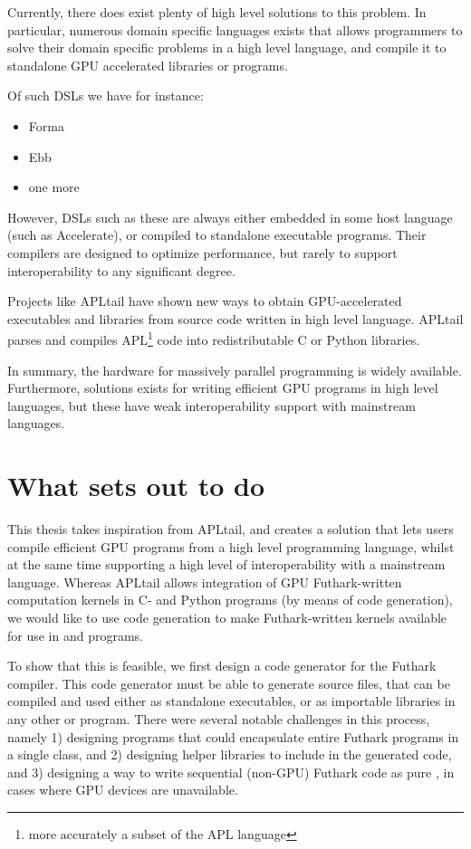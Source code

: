 Currently, there does exist plenty of high level solutions to this problem.
In particular, numerous domain specific languages exists that allows programmers
to solve their domain specific problems in a high level language, and compile it
to standalone GPU accelerated libraries or programs.

Of such DSLs we have for instance:
\begin{itemize}
\item Forma
\item Ebb
\item one more
\end{itemize}

However, DSLs such as these are always either embedded in some host language
(such as Accelerate), or compiled to standalone executable programs. Their
compilers are designed to optimize performance, but rarely to support
interoperability to any significant degree.

Projects like APLtail\cite{apltail} have shown new ways to obtain GPU-accelerated
executables and libraries from source code written in  high level language. APLtail parses
and compiles APL\footnote{more accurately a subset of the APL language} code into redistributable C or Python libraries.

In summary, the hardware for massively parallel programming is widely available.
Furthermore, solutions exists for writing efficient GPU programs in high level
languages, but these have weak interoperability support with mainstream
languages.

\section{What \fshark{} sets out to do}
This thesis takes inspiration from APLtail\cite{apltail}, and creates a solution
that lets users compile efficient GPU programs from a high level programming
language, whilst at the same time supporting a high level of interoperability
with a mainstream language.
Whereas APLtail allows integration of GPU Futhark-written computation kernels in
C- and Python programs (by means of code generation), we would like to use code generation to make Futhark-written kernels available for use in \csharp{} and \fsharp{} programs.

To show that this is feasible, we first design a \csharp{} code generator for the
Futhark compiler. This code generator must be able to generate \csharp{} source
files, that can be compiled and used either as standalone executables, or as
importable libraries in any other \csharp{} or \fsharp{} program.
There were several notable challenges in this process, namely 1) designing
\csharp{} programs that could encapsulate entire Futhark programs in a single
class, and 2) designing helper libraries to include in the generated code, and
3) designing a way to write sequential (non-GPU) Futhark code as pure \csharp{},
in cases where GPU devices are unavailable.

